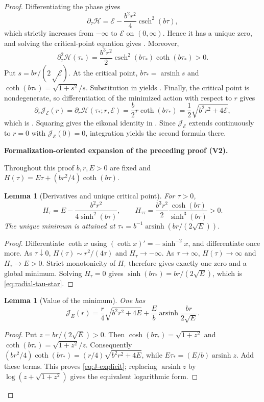 \documentclass[11pt]{article}
\newtheorem{lemma}[theorem]{Lemma}
\newcommand{\formalisationparentid}{X}
\newenvironment{formalisationaddition}[1]{\par\medskip\begingroup\color{blue}\def\formalisationparentid{#1}\setcounter{formalizationsublemma}{0}\let\lemma\formalizationsublemma\let\endlemma\endformalizationsublemma
  \def\Eo{\mathcal E_h^\circ}\def\EE{\mathcal E_h}\def\phio{\phi_h^\circ}\def\phih{\phi_h}\def\Ho{H_h^{\rm atom}(v^\circ)}\def\Ha{H_h^{\rm atom}}\def\HL{H_h^{L}}\def\Dh{D_h}\def\Log{\operatorname{Log}}\def\ellh{\ell_h}\def\Gp{G_{p,h}}\def\Ast{A_{*,h}}\def\ahat{\widehat{\mathfrak a}_h}\def\ah{\mathfrak a_h}\def\rh{\widehat\rho_h}\def\deltah{\widehat\delta_h}\def\oldref##1{\textup{(##1)}}\def\interface##1{\par\noindent\textit{Analytical interface used here.} ##1\par}\def\finish{\par\noindent\textit{Conclusion of the formalization-oriented expansion.} }\par\noindent\textbf{Formalization-oriented expansion of the preceding proof (V2).}\par\smallskip
}{\par\endgroup\medskip
}
\newcommand{\cE}{\mathcal E}
\newcommand{\cJ}{\mathcal J}
\begin{document}
\begin{proof}
Differentiating the phase gives
\[
 \partial_\tau\mathcal H
 =\cE-\frac{b^2r^2}{4}\operatorname{csch}^2(b\tau),
\]
which strictly increases from $-\infty$ to $\cE$ on $(0,\infty)$.  Hence it
has a unique zero, and solving the critical-point equation gives
.  Moreover,
\[
 \partial_\tau^2\mathcal H(\tau_*)
 =\frac{b^3r^2}{2}\operatorname{csch}^2(b\tau_*)
  \coth(b\tau_*)>0.
\]
Put $s=br/(2\sqrt\cE)$.  At the critical point,
$b\tau_*=\operatorname{arsinh}s$ and
$\coth(b\tau_*)=\sqrt{1+s^2}/s$.  Substitution in
 yields .  Finally, the critical point is
nondegenerate, so differentiation of the minimized action with respect to
$r$ gives
\[
 \partial_r\cJ_\cE(r)
 =\partial_r\mathcal H(\tau_*;r,\cE)
 =\frac b2r\coth(b\tau_*)
 =\frac12\sqrt{b^2r^2+4\cE},
\]
which is .  Squaring gives the eikonal identity in
. Since $\cJ_\cE$ extends continuously to $r=0$ with $\cJ_\cE(0)=0$, integration yields the second formula there.

\begin{formalisationaddition}{P2.2}
Throughout this proof $b,r,E>0$ are fixed and $H(\tau)=E\tau+(br^2/4)\coth(b\tau)$.

\begin{lemma}[Derivatives and unique critical point]\label{sublemma:P2-2-critical}
For $\tau>0$,
\[
 H_\tau=E-\frac{b^2r^2}{4\sinh^2(b\tau)},\qquad
 H_{\tau\tau}=\frac{b^3r^2}{2}\frac{\cosh(b\tau)}{\sinh^3(b\tau)}>0.
\]
The unique minimum is attained at
$\tau_*=b^{-1}\operatorname{arsinh}(br/(2\sqrt E))$.
\end{lemma}
\begin{proof}
Differentiate $\coth x$ using $(\coth x)'=-\sinh^{-2}x$, and differentiate once more. As $\tau\downarrow0$, $H(\tau)\sim r^2/(4\tau)$ and $H_\tau\to-\infty$. As $\tau\to\infty$, $H(\tau)\to\infty$ and $H_\tau\to E>0$. Strict monotonicity of $H_\tau$ therefore gives exactly one zero and a global minimum. Solving $H_\tau=0$ gives $\sinh(b\tau_*)=br/(2\sqrt E)$, which is \eqref{eq:radial-tau-star}.
\end{proof}

\begin{lemma}[Value of the minimum]\label{sublemma:P2-2-action-value}
One has
\[
 \cJ_E(r)=\frac r4\sqrt{b^2r^2+4E}
       +\frac Eb\operatorname{arsinh}\frac{br}{2\sqrt E}.
\]
\end{lemma}
\begin{proof}
Put $z=br/(2\sqrt E)>0$. Then $\cosh(b\tau_*)=\sqrt{1+z^2}$ and $\coth(b\tau_*)=\sqrt{1+z^2}/z$. Consequently $(br^2/4)\coth(b\tau_*)=(r/4)\sqrt{b^2r^2+4E}$, while $E\tau_*=(E/b)\operatorname{arsinh}z$. Add these terms. This proves \eqref{eq:J-explicit}; replacing $\operatorname{arsinh}z$ by $\log(z+\sqrt{1+z^2})$ gives the equivalent logarithmic form.
\end{proof}


\end{formalisationaddition}
\end{proof}
\end{document}

